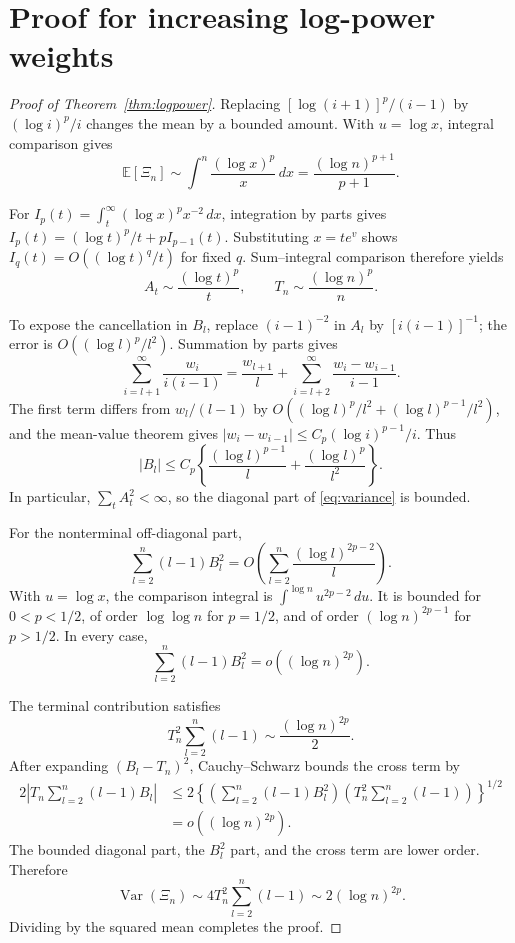 \documentclass[11pt]{article}
\begin{document}
\section{Proof for increasing log-power weights}

\begin{proof}[Proof of Theorem~\ref{thm:logpower}]
Replacing $[\log(i+1)]^p/(i-1)$ by $(\log i)^p/i$ changes the mean by a
bounded amount.  With $u=\log x$, integral comparison gives
\[
\mathbb E[\Xi_n]\sim\int^n\frac{(\log x)^p}{x}\,dx
=\frac{(\log n)^{p+1}}{p+1}.
\]

For $I_p(t)=\int_t^\infty(\log x)^p x^{-2}\,dx$, integration by parts gives
$I_p(t)=(\log t)^p/t+pI_{p-1}(t)$.  Substituting $x=te^v$ shows
$I_q(t)=O((\log t)^q/t)$ for fixed $q$.  Sum--integral comparison therefore
yields
\begin{equation}
A_t\sim\frac{(\log t)^p}{t},\qquad
T_n\sim\frac{(\log n)^p}{n}.
\label{eq:tails}
\end{equation}

To expose the cancellation in $B_l$, replace $(i-1)^{-2}$ in $A_l$ by
$[i(i-1)]^{-1}$; the error is $O((\log l)^p/l^2)$.  Summation by parts gives
\[
\sum_{i=l+1}^\infty\frac{w_i}{i(i-1)}
=\frac{w_{l+1}}{l}+\sum_{i=l+2}^\infty\frac{w_i-w_{i-1}}{i-1}.
\]
The first term differs from $w_l/(l-1)$ by
$O((\log l)^p/l^2+(\log l)^{p-1}/l^2)$, and the mean-value theorem gives
$|w_i-w_{i-1}|\leq C_p(\log i)^{p-1}/i$.  Thus
\begin{equation}
|B_l|\leq C_p\left\{\frac{(\log l)^{p-1}}{l}
+\frac{(\log l)^p}{l^2}\right\}.
\label{eq:Bbound}
\end{equation}
In particular, $\sum_tA_t^2<\infty$, so the diagonal part of
\eqref{eq:variance} is bounded.

For the nonterminal off-diagonal part,
\[
\sum_{l=2}^n(l-1)B_l^2
=O\left(\sum_{l=2}^n\frac{(\log l)^{2p-2}}{l}\right).
\]
With $u=\log x$, the comparison integral is
$\int^{\log n}u^{2p-2}\,du$.  It is bounded for $0<p<1/2$, of order
$\log\log n$ for $p=1/2$, and of order $(\log n)^{2p-1}$ for $p>1/2$.
In every case,
\begin{equation}
\sum_{l=2}^n(l-1)B_l^2=o((\log n)^{2p}).
\label{eq:Blower}
\end{equation}

The terminal contribution satisfies
\[
T_n^2\sum_{l=2}^n(l-1)\sim\frac{(\log n)^{2p}}2.
\]
After expanding $(B_l-T_n)^2$, Cauchy--Schwarz bounds the cross term by
\begin{align*}
2\left|T_n\sum_{l=2}^n(l-1)B_l\right|
&\leq2\left\{
\left(\sum_{l=2}^n(l-1)B_l^2\right)
\left(T_n^2\sum_{l=2}^n(l-1)\right)\right\}^{1/2}\\
&=o((\log n)^{2p}).
\end{align*}
The bounded diagonal part, the $B_l^2$ part, and the cross term are lower
order.  Therefore
\[
\operatorname{Var}(\Xi_n)
\sim4T_n^2\sum_{l=2}^n(l-1)\sim2(\log n)^{2p}.
\]
Dividing by the squared mean completes the proof.
\end{proof}
\end{document}
